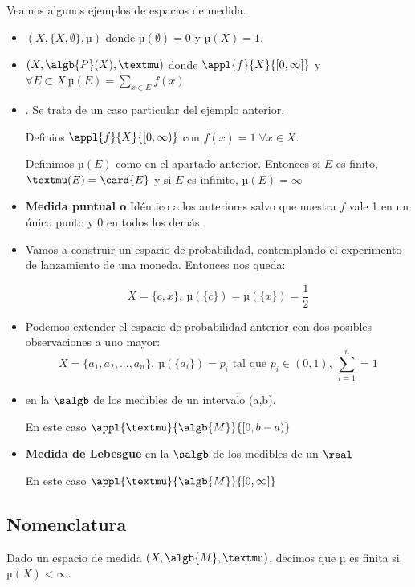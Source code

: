 \documentclass{apuntes}
\begin{document}
Veamos algunos ejemplos de espacios de medida.
\begin{example}
\begin{itemize}
\item $(X, \{X, \emptyset\}, µ)$ donde $µ(\emptyset)=0$ y $µ(X)=1$.

\item $(X, \algb{P}(X), µ)$ donde $\appl{f}{X}{[0, \infty]}$ y $\forall E \subset X \ µ(E)=\sum_{x \in E}f(x)$

\item \textbf{}. Se trata de un caso particular del ejemplo anterior.

Definios $\appl{f}{X}{[0, \infty)}$ con $f(x)=1\; \forall x \in X$.

Definimos $µ(E)$ como en el apartado anterior. Entonces si $E$ es finito, $µ(E) = \card{E}$ y si $E$ es infinito, $µ(E) = \infty$

\item \textbf{Medida puntual o }
Idéntico a los anteriores salvo que nuestra $f$ vale 1 en un único punto y 0 en todos los demás.

\item Vamos a construir un espacio de probabilidad, contemplando el experimento de lanzamiento de una moneda. Entonces nos queda:

\[X=\{c, x\}, \ µ(\{c\})=µ(\{x\})=\frac{1}{2}\]

\item Podemos extender el espacio de probabilidad anterior con dos posibles observaciones a uno mayor:
\[X=\{a_1, a_2, ..., a_n\}, \ µ(\{a_i\})=p_i \text{ tal que } p_i\in(0,1), \ \sum_{i=1}^{n}=1\]

\item \textbf{} en la $\salgb$ de los medibles de un intervalo (a,b).

En este caso $\appl{µ}{\algb{M}}{[0,b-a)}$

\item \textbf{Medida de Lebesgue} en la $\salgb$ de los medibles de un $\real$

En este caso $\appl{µ}{\algb{M}}{[0, \infty]}$

\end{itemize}

\subsection{Nomenclatura}
\begin{defn}
Dado un espacio de medida $(X, \algb{M}, µ)$, decimos que µ es finita si $µ(X)< \infty$.
\end{defn}


\end{example}
\end{document}
